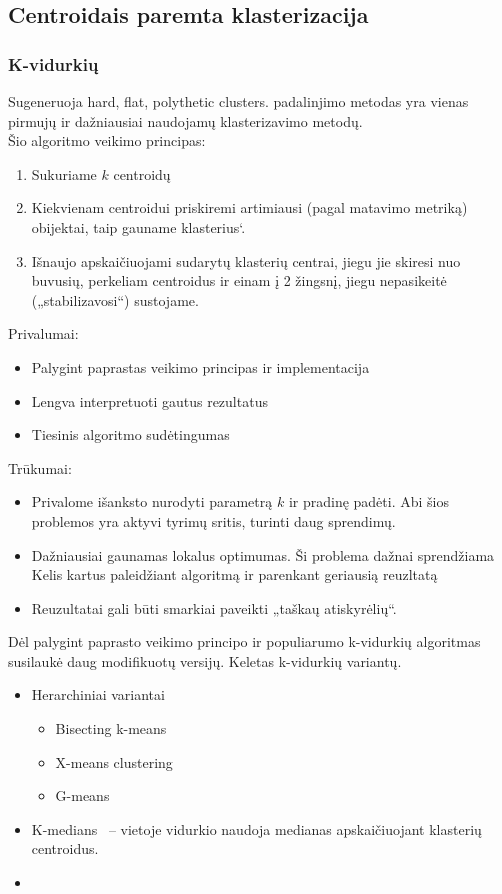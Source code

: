 \documentclass{VUMIFInfKursinis}
\begin{document}
	\subsection{Centroidais paremta klasterizacija}
		\subsubsection{K-vidurkių}
			Sugeneruoja hard, flat, polythetic clusters.
			 \cite{macqueen1967some} padalinjimo metodas yra vienas pirmujų ir dažniausiai naudojamų klasterizavimo metodų. \\
			Šio algoritmo veikimo principas:
			\begin{enumerate}
				\item Sukuriame $k$ centroidų
				\item Kiekvienam centroidui priskiremi artimiausi (pagal matavimo metriką) obijektai, taip gauname klasterius`.
				\item Išnaujo apskaičiuojami sudarytų klasterių centrai, jiegu jie skiresi nuo buvusių, perkeliam centroidus ir einam į 2 žingsnį, jiegu nepasikeitė („stabilizavosi“) sustojame.
			\end{enumerate}
			Privalumai:
			\begin{itemize}
				\item Palygint paprastas veikimo principas ir implementacija
				\item Lengva interpretuoti gautus rezultatus
				\item Tiesinis algoritmo sudėtingumas
			\end{itemize}
			Trūkumai:
			\begin{itemize}
				\item Privalome išanksto nurodyti parametrą $k$ ir pradinę padėti. Abi šios problemos yra aktyvi tyrimų sritis, turinti daug sprendimų.
				\item Dažniausiai gaunamas lokalus optimumas. Ši problema dažnai sprendžiama Kelis kartus paleidžiant algoritmą ir parenkant geriausią reuzltatą
				\item Reuzultatai gali būti smarkiai paveikti „taškaų atiskyrėlių“.
			\end{itemize}
			Dėl palygint paprasto veikimo principo ir populiarumo k-vidurkių algoritmas susilaukė daug modifikuotų versijų. Keletas k-vidurkių variantų. 
			\begin{itemize}
				\item Herarchiniai variantai
				\begin{itemize}
					\item Bisecting k-means\cite{steinbach2000comparison}
					\item X-means clustering\cite{pelleg2000x}
					\item G-means \cite{hamerly2004learning}
				\end{itemize} 
				\item K-medians~\cite{jain1988algorithms} – vietoje vidurkio naudoja medianas apskaičiuojant klasterių centroidus.
				\item 

			\end{itemize} 
\end{document}
